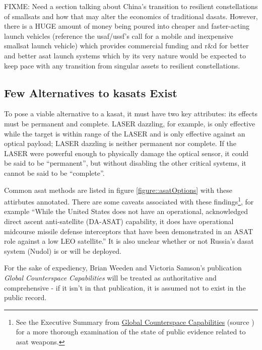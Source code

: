 FIXME: Need a section talking about China's transition to resilient
constellations of smallsats and how that may alter the economics of
traditional dasats.  However, there is a HUGE amount of money being
poured into cheaper and faster-acting launch vehicles (reference the
usaf/ussf's call for a mobile and inexpensive smallsat launch vehicle)
which provides commercial funding and r\&d for better and better asat
launch systems which by its very nature would be expected to keep pace
with any transition from singular assets to resilient constellations.


\subsection{Few Alternatives to \acp{kasat} Exist}

To pose a viable alternative to a \ac{kasat}, it must have two key
attributes: its effects must be permanent and complete.  LASER
dazzling, for example, is only effective while the target is within
range of the LASER and is only effective against an optical payload;
LASER dazzling is neither permanent nor complete.  If the LASER were
powerful enough to physically damage the optical sensor, it could be
said to be ``permanent'', but without disabling the other critical
systems, it cannot be said to be ``complete''.

Common \ac{asat} methods are listed in figure
\ref{figure::asatOptions} with these attirbutes annotated.  There are
some caveats associated with these findings\footnote{See the Executive
Summary from
\href{https://swfound.org/media/207344/swf_global_counterspace_capabilities_2022.pdf}{Global
  Counterspace Capabilities} (source \cite{brian}) for a more thorough
examination of the state of public evidence related to \acl{asat}
weapons.}, for example ``While the United States does not have an
operational, acknowledged direct ascent anti-satellite (DA-ASAT)
capability, it does have operational midcourse missile defense
interceptors that have been demonstrated in an ASAT role against a low
LEO satellite.''\cite[pxiii]{brian} It is also unclear whether or not
Russia's \ac{dasat} system (Nudol) is or will be
deployed.\cite[pxv]{brian}

For the sake of expediency, Brian Weeden and Victoria Samson's
publication {\it Global Counterspace Capabilities}\cite{brian} will be
treated as authoritative and comprehensive - if it isn't in that
publication, it is assumed not to exist in the public record.

